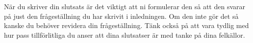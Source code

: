 \documentclass{article}
\begin{document}
När du skriver din slutsats är det viktigt att ni formulerar den så att den svarar på just den frågeställning du har skrivit i inledningen. Om den inte gör det så kanske du behöver revidera din frågeställning. Tänk också på att vara tydlig med hur pass tillförlitliga du anser att dina slutsatser är med tanke på dina felkällor.
\clearpage
~\cite{wiki:graf}
{}

\end{document}
